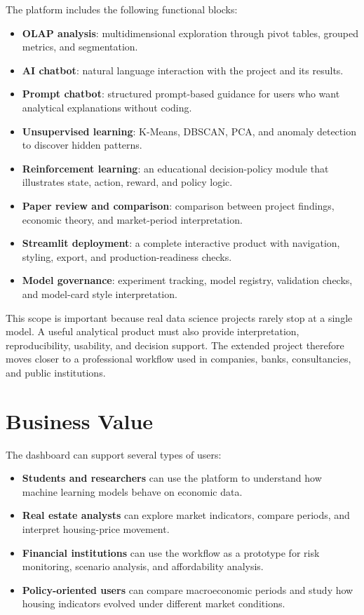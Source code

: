 The platform includes the following functional blocks:
\begin{itemize}
\item \textbf{OLAP analysis}: multidimensional exploration through pivot tables, grouped metrics, and segmentation.
\item \textbf{AI chatbot}: natural language interaction with the project and its results.
\item \textbf{Prompt chatbot}: structured prompt-based guidance for users who want analytical explanations without coding.
\item \textbf{Unsupervised learning}: K-Means, DBSCAN, PCA, and anomaly detection to discover hidden patterns.
\item \textbf{Reinforcement learning}: an educational decision-policy module that illustrates state, action, reward, and policy logic.
\item \textbf{Paper review and comparison}: comparison between project findings, economic theory, and market-period interpretation.
\item \textbf{Streamlit deployment}: a complete interactive product with navigation, styling, export, and production-readiness checks.
\item \textbf{Model governance}: experiment tracking, model registry, validation checks, and model-card style interpretation.
\end{itemize}

This scope is important because real data science projects rarely stop at a single model. A useful analytical product must also provide interpretation, reproducibility, usability, and decision support. The extended project therefore moves closer to a professional workflow used in companies, banks, consultancies, and public institutions.

\section{Business Value}

The dashboard can support several types of users:
\begin{itemize}
\item \textbf{Students and researchers} can use the platform to understand how machine learning models behave on economic data.
\item \textbf{Real estate analysts} can explore market indicators, compare periods, and interpret housing-price movement.
\item \textbf{Financial institutions} can use the workflow as a prototype for risk monitoring, scenario analysis, and affordability analysis.
\item \textbf{Policy-oriented users} can compare macroeconomic periods and study how housing indicators evolved under different market conditions.
\end{itemize}

